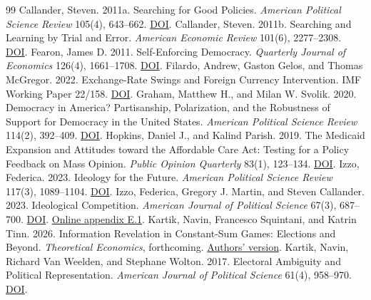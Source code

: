 \documentclass[11pt,letterpaper]{article}
\begin{document}
\begin{thebibliography}{99}
 Callander, Steven. 2011a. Searching for Good Policies. \emph{American Political Science Review} 105(4), 643--662. \href{https://doi.org/10.1017/S0003055411000426}{DOI}.
 Callander, Steven. 2011b. Searching and Learning by Trial and Error. \emph{American Economic Review} 101(6), 2277--2308. \href{https://doi.org/10.1257/aer.101.6.2277}{DOI}.
 Fearon, James D. 2011. Self-Enforcing Democracy. \emph{Quarterly Journal of Economics} 126(4), 1661--1708. \href{https://doi.org/10.1093/qje/qjr038}{DOI}.
 Filardo, Andrew, Gaston Gelos, and Thomas McGregor. 2022. Exchange-Rate Swings and Foreign Currency Intervention. IMF Working Paper 22/158. \href{https://doi.org/10.5089/9798400215322.001}{DOI}.
 Graham, Matthew H., and Milan W. Svolik. 2020. Democracy in America? Partisanship, Polarization, and the Robustness of Support for Democracy in the United States. \emph{American Political Science Review} 114(2), 392--409. \href{https://doi.org/10.1017/S0003055420000052}{DOI}.
 Hopkins, Daniel J., and Kalind Parish. 2019. The Medicaid Expansion and Attitudes toward the Affordable Care Act: Testing for a Policy Feedback on Mass Opinion. \emph{Public Opinion Quarterly} 83(1), 123--134. \href{https://doi.org/10.1093/poq/nfz004}{DOI}.
 Izzo, Federica. 2023. Ideology for the Future. \emph{American Political Science Review} 117(3), 1089--1104. \href{https://doi.org/10.1017/S0003055422000843}{DOI}.
 Izzo, Federica, Gregory J. Martin, and Steven Callander. 2023. Ideological Competition. \emph{American Journal of Political Science} 67(3), 687--700. \href{https://doi.org/10.1111/ajps.12763}{DOI}. \href{https://www.federicaizzo.com/pdf/Ideological_Competition_FINAL_Website.pdf\#page=44}{Online appendix E.1}.
 Kartik, Navin, Francesco Squintani, and Katrin Tinn. 2026. Information Revelation in Constant-Sum Games: Elections and Beyond. \emph{Theoretical Economics}, forthcoming. \href{https://navinkartik.com/Papers/html/KST-InfoRev/}{Authors' version}.
 Kartik, Navin, Richard Van Weelden, and Stephane Wolton. 2017. Electoral Ambiguity and Political Representation. \emph{American Journal of Political Science} 61(4), 958--970. \href{https://doi.org/10.1111/ajps.12310}{DOI}.

\end{thebibliography}
\end{document}
